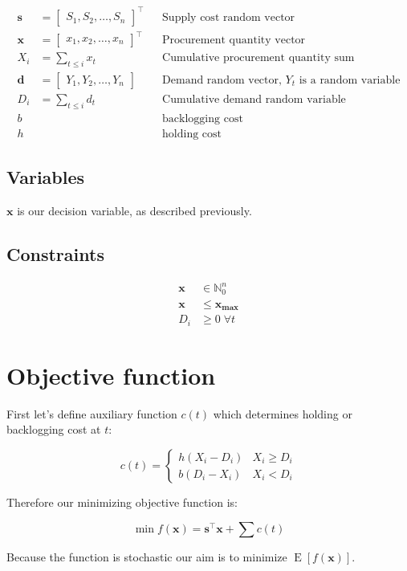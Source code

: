 \begin{align*}
    \mathbf{s} &= \begin{bmatrix}
        S_1, S_2, \dotsc, S_n
    \end{bmatrix}^\intercal && \text{Supply cost random vector} \\
    \mathbf{x} &= \begin{bmatrix}
        x_1, x_2, \dotsc, x_n
    \end{bmatrix}^\intercal && \text{Procurement quantity vector} \\
    X_i &= \sum_{t\le i}{x_t} && \text{Cumulative procurement quantity sum} \\
    \mathbf{d} &= \begin{bmatrix}
        Y_1, Y_2, \dotsc, Y_n
    \end{bmatrix} && \text{Demand random vector, $Y_t$ is a random variable} \\
    D_i &= \sum_{t\le i}{d_t} && \text{Cumulative demand random variable} \\
    b & && \text{backlogging cost} \\
    h & && \text{holding cost}
\end{align*}

\subsection{Variables}
\label{sub:Variables}
$\mathbf{x}$ is our decision variable, as described previously.
\subsection{Constraints}
\label{sub:Constraints}
\begin{align*}
    \mathbf{x} &\in \mathbb{N}_0^n \\
    \mathbf{x} &\le \mathbf{x_{\text{max}}}\\
    D_i &\ge 0 \; \forall t
\end{align*}

\section{Objective function}

First let's define auxiliary function $c(t)$ which determines holding or backlogging cost at $t$:

\begin{equation}
    c(t) = \begin{cases}
        h \left( X_i - D_i \right) & X_i \ge D_i \\
        b \left( D_i - X_i \right) & X_i < D_i
    \end{cases}
    \label{eq:cost-t}
\end{equation}

Therefore our minimizing objective function is:

\begin{equation}
    \min f(\mathbf{x}) = \mathbf{s}^\intercal\mathbf{x} + \sum{c(t)}
    \label{eq:cost-f}
\end{equation}

Because the function is stochastic our aim is to minimize $ \operatorname{E} \left[ f(\mathbf{x}) \right]$.
